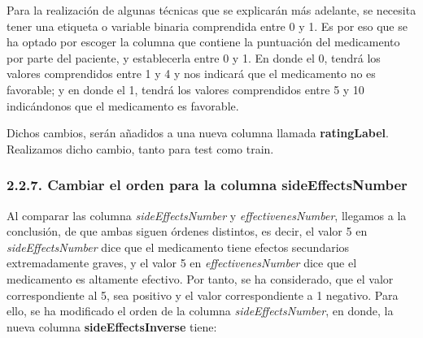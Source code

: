 \documentclass[spanish,]{article}
\newenvironment{Shaded}{\begin{snugshade}}{\end{snugshade}}
\newcommand{\KeywordTok}[1]{\textcolor[rgb]{0.13,0.29,0.53}{\textbf{#1}}}
\newcommand{\DecValTok}[1]{\textcolor[rgb]{0.00,0.00,0.81}{#1}}
\newcommand{\StringTok}[1]{\textcolor[rgb]{0.31,0.60,0.02}{#1}}
\newcommand{\CommentTok}[1]{\textcolor[rgb]{0.56,0.35,0.01}{\textit{#1}}}
\newcommand{\ControlFlowTok}[1]{\textcolor[rgb]{0.13,0.29,0.53}{\textbf{#1}}}
\newcommand{\OperatorTok}[1]{\textcolor[rgb]{0.81,0.36,0.00}{\textbf{#1}}}
\newcommand{\NormalTok}[1]{#1}
\begin{document}
Para la realización de algunas técnicas que se explicarán más adelante,
se necesita tener una etiqueta o variable binaria comprendida entre 0 y
1. Es por eso que se ha optado por escoger la columna que contiene la
puntuación del medicamento por parte del paciente, y establecerla entre
0 y 1. En donde el 0, tendrá los valores comprendidos entre 1 y 4 y nos
indicará que el medicamento no es favorable; y en donde el 1, tendrá los
valores comprendidos entre 5 y 10 indicándonos que el medicamento es
favorable.

Dichos cambios, serán añadidos a una nueva columna llamada
\textbf{ratingLabel}. Realizamos dicho cambio, tanto para test como
train.

\begin{Shaded}
\end{Shaded}

\subsubsection{2.2.7. Cambiar el orden para la columna
sideEffectsNumber}\label{cambiar-el-orden-para-la-columna-sideeffectsnumber}

Al comparar las columna \emph{sideEffectsNumber} y
\emph{effectivenesNumber}, llegamos a la conclusión, de que ambas siguen
órdenes distintos, es decir, el valor 5 en \emph{sideEffectsNumber} dice
que el medicamento tiene efectos secundarios extremadamente graves, y el
valor 5 en \emph{effectivenesNumber} dice que el medicamento es
altamente efectivo. Por tanto, se ha considerado, que el valor
correspondiente al 5, sea positivo y el valor correspondiente a 1
negativo. Para ello, se ha modificado el orden de la columna
\emph{sideEffectsNumber}, en donde, la nueva columna
\textbf{sideEffectsInverse} tiene:
\end{document}
